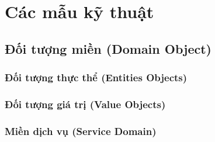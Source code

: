 \chapter{Các mẫu kỹ thuật}

% 

\section{Đối tượng miền (Domain Object)}

% 

\subsection{Đối tượng thực thể (Entities Objects)}



\subsection{Đối tượng giá trị (Value Objects)}


% 

\subsection{Miền dịch vụ (Service Domain)}

% 




% 




% 

% 


